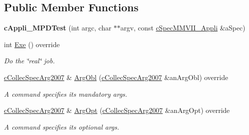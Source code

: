 \subsection*{Public Member Functions}
\begin{DoxyCompactItemize}
\item 
{\bfseries c\+Appli\+\_\+\+M\+P\+D\+Test} (int argc, char $\ast$$\ast$argv, const \hyperlink{classMMVII_1_1cSpecMMVII__Appli}{c\+Spec\+M\+M\+V\+I\+I\+\_\+\+Appli} \&a\+Spec)\hypertarget{classMMVII_1_1cAppli__MPDTest_a6a4c0a1d139449a687f89db2eb88fd5b}{}\label{classMMVII_1_1cAppli__MPDTest_a6a4c0a1d139449a687f89db2eb88fd5b}

\item 
int \hyperlink{classMMVII_1_1cAppli__MPDTest_a77aeb6565769e750e826ddae80715727}{Exe} () override\hypertarget{classMMVII_1_1cAppli__MPDTest_a77aeb6565769e750e826ddae80715727}{}\label{classMMVII_1_1cAppli__MPDTest_a77aeb6565769e750e826ddae80715727}

\begin{DoxyCompactList}\small\item\em Do the \char`\"{}real\char`\"{} job. \end{DoxyCompactList}\item 
\hyperlink{classMMVII_1_1cCollecSpecArg2007}{c\+Collec\+Spec\+Arg2007} \& \hyperlink{classMMVII_1_1cAppli__MPDTest_a659d0e2ac44c708fb2f791f1cdb14c4c}{Arg\+Obl} (\hyperlink{classMMVII_1_1cCollecSpecArg2007}{c\+Collec\+Spec\+Arg2007} \&an\+Arg\+Obl) override\hypertarget{classMMVII_1_1cAppli__MPDTest_a659d0e2ac44c708fb2f791f1cdb14c4c}{}\label{classMMVII_1_1cAppli__MPDTest_a659d0e2ac44c708fb2f791f1cdb14c4c}

\begin{DoxyCompactList}\small\item\em A command specifies its mandatory args. \end{DoxyCompactList}\item 
\hyperlink{classMMVII_1_1cCollecSpecArg2007}{c\+Collec\+Spec\+Arg2007} \& \hyperlink{classMMVII_1_1cAppli__MPDTest_a0503381e5bc5ad09779c3682d2f37c2f}{Arg\+Opt} (\hyperlink{classMMVII_1_1cCollecSpecArg2007}{c\+Collec\+Spec\+Arg2007} \&an\+Arg\+Opt) override\hypertarget{classMMVII_1_1cAppli__MPDTest_a0503381e5bc5ad09779c3682d2f37c2f}{}\label{classMMVII_1_1cAppli__MPDTest_a0503381e5bc5ad09779c3682d2f37c2f}

\begin{DoxyCompactList}\small\item\em A command specifies its optional args. \end{DoxyCompactList}\end{DoxyCompactItemize}
